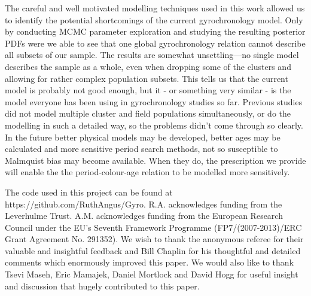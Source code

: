 \documentclass[useAMS, usenatbib]{mn2e}
\begin{document}

The careful and well motivated modelling techniques used in this work
allowed us to identify the potential shortcomings of the current
gyrochronology model.
Only by conducting MCMC parameter exploration and studying the resulting
posterior PDFs were we able to see that one global gyrochronology relation
cannot describe all subsets of our sample.
The results are somewhat unsettling---no single model describes the sample as
a whole, even when dropping some of the clusters and allowing for rather
complex population subsets.
This tells us that the current model is probably not good enough, but it - or
something very similar - is the model everyone has been using in
gyrochronology studies so far.
Previous studies did not model multiple cluster and field populations
simultaneously, or do the modelling in such a detailed way, so the problems
didn’t come through so clearly.
In the future better physical models may be developed, better ages may be
calculated and more sensitive period search methods, not so susceptible to
Malmquist bias may become available.
When they do, the prescription we provide will enable the the
period-colour-age relation to be modelled more sensitively.




The code used in this project can be found at
https://github.com/RuthAngus/Gyro.
R.A. acknowledges funding from the Leverhulme Trust.
A.M. acknowledges funding from the European Research Council under the EU’s
Seventh Framework Programme (FP7/(2007-2013)/ERC Grant Agreement No. 291352).
We wish to thank the anonymous referee for their valuable and insightful
feedback and Bill Chaplin for his thoughtful and detailed comments
which enormously improved this paper.
We would also like to thank Tsevi Maseh, Eric Mamajek, Daniel Mortlock and
David Hogg for useful insight and discussion that hugely contributed to this
paper.



\end{document}
